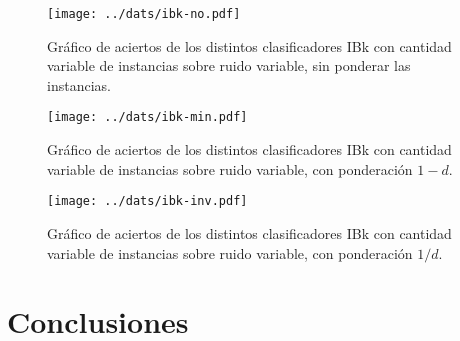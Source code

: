 \documentclass[a4paper,10pt]{article}
\begin{document}
\begin{figure}
\centering
\texttt{[image: ../dats/ibk-no.pdf]}
\caption{Gráfico de aciertos de los distintos clasificadores \textsf{IBk} con cantidad variable de instancias sobre ruido variable, sin ponderar las instancias.}
\end{figure}

\begin{figure}
\centering
\texttt{[image: ../dats/ibk-min.pdf]}
\caption{Gráfico de aciertos de los distintos clasificadores \textsf{IBk} con cantidad variable de instancias sobre ruido variable, con ponderación $1-d$.}
\end{figure}

\begin{figure}
\centering
\texttt{[image: ../dats/ibk-inv.pdf]}
\caption{Gráfico de aciertos de los distintos clasificadores \textsf{IBk} con cantidad variable de instancias sobre ruido variable, con ponderación $1/d$.}
\end{figure}
\section{Conclusiones}
\end{document}
